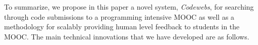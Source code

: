 To summarize, we propose in this paper a novel system, \emph{Codewebs}, for searching through code
submissions to a programming intensive MOOC as well as a methodology for scalably providing
human level feedback to students in the MOOC.
%
The main technical innovations that we have developed are as follows.
